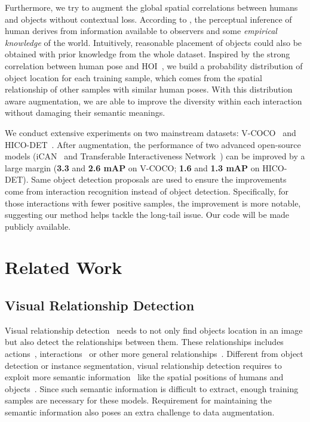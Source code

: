 \documentclass[10pt,twocolumn,letterpaper]{article}
\begin{document}
Furthermore, we try to augment the global spatial correlations between humans and objects without contextual loss. According to \cite{knill1996introduction}, the perceptual inference of human derives from information available to observers and some \emph{empirical knowledge} of the world. Intuitively, reasonable placement of objects could also be obtained with prior knowledge from the whole dataset. Inspired by the strong correlation between human pose and HOI~\cite{yao2012recognizing}, we build a probability distribution of object location for each training sample, which comes from the spatial relationship of other samples with similar human poses. With this distribution aware augmentation, we are able to improve the diversity within each interaction without damaging their semantic meanings.

We conduct extensive experiments on two mainstream datasets: V-COCO~\cite{gupta2015visual} and HICO-DET~\cite{chao2018learning}. After augmentation, the performance of two advanced open-source models (iCAN~\cite{gao2018ican} and Transferable Interactiveness Network~\cite{li2019transferable}) can be improved by a large margin (\textbf{3.3} and \textbf{2.6 mAP} on V-COCO; \textbf{1.6} and \textbf{1.3 mAP} on HICO-DET). Same object detection proposals are used to ensure the improvements come from interaction recognition instead of object detection. Specifically, for those interactions with fewer positive samples, the improvement is more notable, suggesting our method helps tackle the long-tail issue. Our code will be made publicly available.


\section{Related Work}
\subsection{Visual Relationship Detection}
Visual relationship detection~\cite{lu2016visual,xu2017scene,gkioxari2018detecting,zellers2018neural,zhang2017visual} needs to not only find objects location in an image but also detect the relationships between them. These relationships includes actions~\cite{Shao_2020_CVPR}, interactions~\cite{gkioxari2018detecting} or other more general relationships~\cite{lu2016visual,zhang2017visual}. Different from object detection or instance segmentation, visual relationship detection requires to exploit more semantic information~\cite{baldassano2017human} like the spatial positions of humans and objects~\cite{chao2018learning}. Since such semantic information is difficult to extract, enough training samples are necessary for these models. Requirement for maintaining the semantic information also poses an extra challenge to data augmentation.
\end{document}
